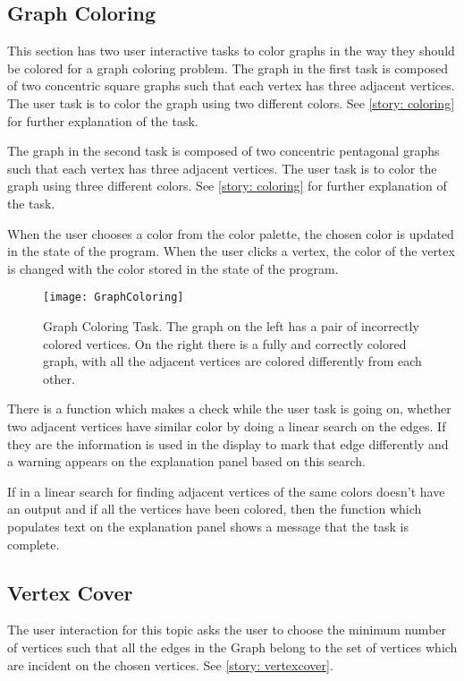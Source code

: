 \subsection{Graph Coloring}
This section has two user interactive tasks to color graphs in the way they
should be colored for a graph coloring problem.
The graph in the first task is composed of two concentric square graphs such
that each vertex has three adjacent vertices. The user task is to color the
graph using two different colors. See \autoref{story: coloring} for further
explanation of the task.

The graph in the second task is composed of two concentric pentagonal graphs such
that each vertex has three adjacent vertices. The user task is to color the
graph using three different colors. See \autoref{story: coloring} for further
explanation of the task.

When the user chooses a color from the color palette, the chosen color is
updated in the state of the program. When the user clicks a vertex, the color
of the vertex is changed with the color stored in the state of the program.

\begin{figure}[h]
\centering
\texttt{[image: GraphColoring]}
\caption{
        Graph Coloring Task. The graph on the left has a pair of incorrectly
        colored vertices. On the right there is a fully and correctly colored
        graph, with all the adjacent vertices are colored differently from each
        other.
        }
\label{animationfigure: max3cut}
\end{figure}

There is a function which makes a check while the user task is going on, whether
two adjacent vertices have similar color by doing a linear search on the edges.
If they are the information is used in the display to mark that edge differently
and a warning appears on the explanation panel based on this search.

If in a linear search for finding adjacent vertices of the same colors
doesn't have an output and if all the vertices have been colored, then
the function which populates text on the explanation panel shows a message that
the task is complete.

\subsection{Vertex Cover}


The user interaction for this topic asks the user to choose the minimum number
of vertices such that all the edges in the Graph belong to the set of vertices
which are incident on the chosen vertices. See \autoref{story: vertexcover}.

